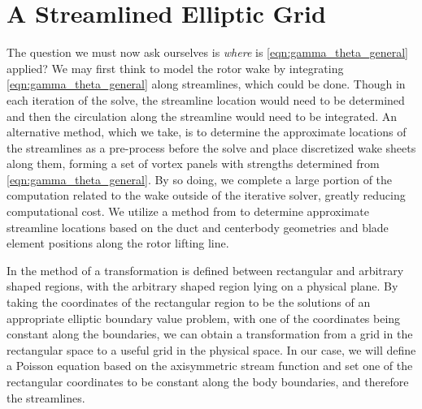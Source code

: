 \section{A Streamlined Elliptic Grid}
\label{sec:rotorwakegeometry}

The question we must now ask ourselves is \textit{where} is \cref{eqn:gamma_theta_general} applied?
%
We may first think to model the rotor wake by integrating \cref{eqn:gamma_theta_general} along streamlines, which could be done.
%
Though in each iteration of the solve, the streamline location would need to be determined and then the circulation along the streamline would need to be integrated.
%
An alternative method, which we take, is to determine the approximate locations of the streamlines as a pre-process before the solve and place discretized wake sheets along them, forming a set of vortex panels with strengths determined from \cref{eqn:gamma_theta_general}.
%
By so doing, we complete a large portion of the computation related to the wake outside of the iterative solver, greatly reducing computational cost.
%
We utilize a method from \citeauthor{thompson_1974} to determine approximate streamline locations based on the duct and centerbody geometries and blade element positions along the rotor lifting line.

In the method of \citeauthor{thompson_1974} a transformation is defined between rectangular and arbitrary shaped regions, with the arbitrary shaped region lying on a physical plane.
%
By taking the coordinates of the rectangular region to be the solutions of an appropriate elliptic boundary value problem, with one of the coordinates being constant along the boundaries, we can obtain a transformation from a grid in the rectangular space to a useful grid in the physical space.
%
In our case, we will define a Poisson equation based on the axisymmetric stream function and set one of the rectangular coordinates to be constant along the body boundaries, and therefore the streamlines.
%





